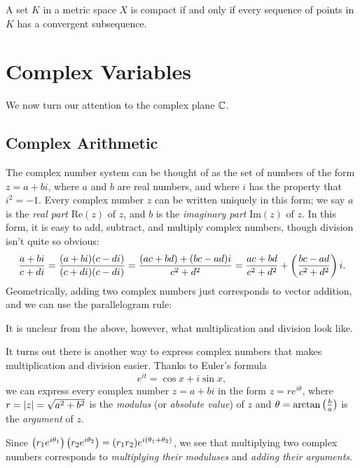 \documentclass[twoside]{article}
\newcommand*{\1}{\mathbbm{1}}
\renewcommand*{\Re}{\mathrm{Re}}
\renewcommand*{\Im}{\mathrm{Im}}
\begin{document}
\begin{thm}
  A set \(K\) in a metric space \(X\) is compact if and only if every sequence of points in \(K\) has a convergent subsequence.
\end{thm}

\section{Complex Variables}
We now turn our attention to the complex plane \(\mathbb{C}\).

\subsection{Complex Arithmetic}
The complex number system can be thought of as the set of numbers of the form \(z = a + bi\), where \(a\) and \(b\) are real numbers, and where \(i\) has the property that \(i^2 = -1\). Every complex number \(z\) can be written uniquely in this form; we say \(a\) is the \emph{real part} \(\Re(z)\) of \(z\), and \(b\) is the \emph{imaginary part} \(\Im(z)\) of \(z\). In this form, it is easy to add, subtract, and multiply complex numbers, though division isn't quite so obvious:
\[
  \frac{a + bi}{c + di} = \frac{(a+bi)(c - di)}{(c+di)(c-di)} = \frac{(ac + bd) + (bc-ad)i}{c^2 + d^2} = \frac{ac + bd}{c^2+d^2} + \del{\frac{bc-ad}{c^2+d^2}}i.
\]
Geometrically, adding two complex numbers just corresponds to vector addition, and we can use the parallelogram rule:
\begin{figure}[H]
  \centering
\end{figure}
It is unclear from the above, however, what multiplication and division look like.

It turns out there is another way to express complex numbers that makes multiplication and division easier. Thanks to Euler's formula
\[
  e^{it} = \cos x + i\sin x,
\]
we can express every complex number \(z=a+bi\) in the form \(z = re^{i\theta}\), where \(r = \abs{z} = \sqrt{a^2+b^2}\) is the \emph{modulus} (or \emph{absolute value}) of \(z\) and \(\theta = \arctan\del{\frac b a}\) is the \emph{argument} of \(z\).

Since \(\del{r_1 e^{i\theta_1}}\del{r_2 e^{i\theta_2}} = (r_1r_2) e^{i (\theta_1 + \theta_2)}\), we see that multiplying two complex numbers corresponds to \emph{multiplying their moduluses} and \emph{adding their arguments}.
\end{document}
